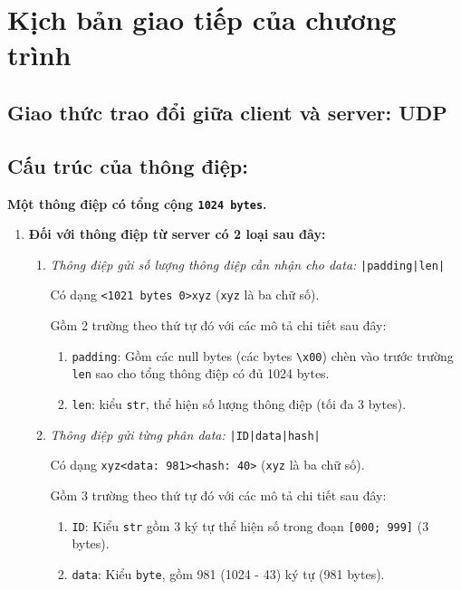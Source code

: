 \section{Kịch bản giao tiếp của chương trình}
\subsection{Giao thức trao đổi giữa client và server: UDP}
\subsection{Cấu trúc của thông điệp:}

\large\textbf{Một thông điệp có tổng cộng \texttt{1024 bytes}.} 
\begin{enumerate}
\item \textbf{Đối với thông điệp từ server có 2 loại sau đây:}
\normalsize
\begin{enumerate}
\item \textit{Thông điệp gửi số lượng thông điệp cần nhận cho data:} \texttt{|padding|len|}

Có dạng \texttt{<1021 bytes 0>xyz} (\texttt{xyz} là ba chữ số).

Gồm 2 trường theo thứ tự đó với các mô tả chi tiết sau đây:

\begin{enumerate}
\item \texttt{padding}: Gồm các null bytes (các bytes \texttt{\textbackslash x00}) chèn vào trước trường \texttt{len} sao cho tổng thông điệp có đủ 1024 bytes.

\item \texttt{len}: kiểu \texttt{str}, thể hiện số lượng thông điệp (tối đa 3 bytes).
\end{enumerate}

\item \textit{Thông điệp gửi từng phân data:} \texttt{|ID|data|hash|}

Có dạng \texttt{xyz<data: 981><hash: 40>} (\texttt{xyz} là ba chữ số).

Gồm 3 trường theo thứ tự đó với các mô tả chi tiết sau đây:

\begin{enumerate}
\item \texttt{ID}: Kiểu \texttt{str} gồm 3 ký tự thể hiện số trong đoạn \texttt{[000; 999]} (3 bytes).

\item \texttt{data}: Kiểu \texttt{byte}, gồm 981 (1024 - 43) ký tự (981 bytes).


\end{enumerate}
\end{enumerate}
\end{enumerate}
